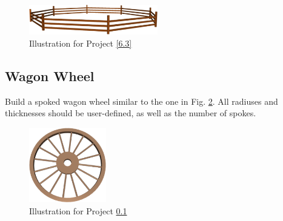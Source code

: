 \begin{figure}[!ht]
\begin{center}
\includegraphics[width=0.5\textwidth]{img/tam-3.png}
\end{center}
\vspace{-2mm}
\caption{Illustration for Project \ref{6.3}}
\label{fig:corral2}
\end{figure}
\noindent


\subsection{Wagon Wheel} \label{6.4}
Build a spoked wagon wheel similar to the one in Fig. \ref{fig:wheel-1}. All radiuses 
and thicknesses should be user-defined, as well as the number of spokes.


\begin{figure}[!ht]
\begin{center}
\includegraphics[width=0.3\textwidth]{img/wagonwheel-1.png}
\end{center}
\vspace{-4mm}
\caption{Illustration for Project \ref{6.4}}
\label{fig:wheel-1}
\end{figure}
\noindent

